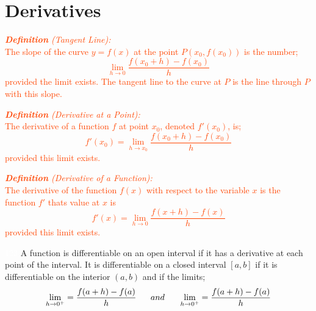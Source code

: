\documentclass{report}
\newenvironment{definition}[1][OrangeRed]
  {\begin{tcolorbox}[colframe=#1,colback=white]}
  {\end{tcolorbox}}
\begin{document}
\chapter{Derivatives}

\begin{definition}
    \textcolor{OrangeRed}{\textit{\textbf{Definition} (Tangent Line):}\\
    The slope of the curve $y=f(x)$ at the point $P(x_0, f(x_0))$ is the number;
    \begin{equation}
        \lim_{h \to 0} \frac{f(x_0 + h) - f(x_0)}{h}
    \end{equation}
    provided the limit exists. The tangent line to the curve at $P$ is the line through $P$ with this slope.}
\end{definition}

\begin{definition}
    \textcolor{OrangeRed}{\textit{\textbf{Definition} (Derivative at a Point):}\\
    The derivative of a function $f$ at point $x_0$, denoted $f'(x_0)$, is;
    \begin{equation}
        f'(x_0) = \lim_{h \to x_0} \frac{f(x_0 + h) - f(x_0)}{h} 
    \end{equation}
    provided this limit exists.}
\end{definition}

\begin{definition}
    \textcolor{OrangeRed}{\textit{\textbf{Definition} (Derivative of a Function):}\\
    The derivative of the function $f(x)$ with respect to the variable $x$ is the function $f'$ thats value at $x$ is
    \begin{equation}
        f'(x) = \lim_{h \to 0} \frac{f(x + h) - f(x)}{h}
    \end{equation}
    provided this limit exists.}
\end{definition}

\textcolor{White}{123}
A function is differentiable on an open interval if it has a derivative at each point of the interval. It is differentiable on a closed interval $[a,b]$ if it is differentiable on the interior $(a,b)$ and if the limits;
\begin{equation}
    \lim_{h \to 0^+} = \frac{f(a + h) - f(a)}{h} \; \; \; \; \; \; and \; \; \; \; \; \; \lim_{h \to 0^+} = \frac{f(a + h) - f(a)}{h}\\
\end{equation}
\end{document}
